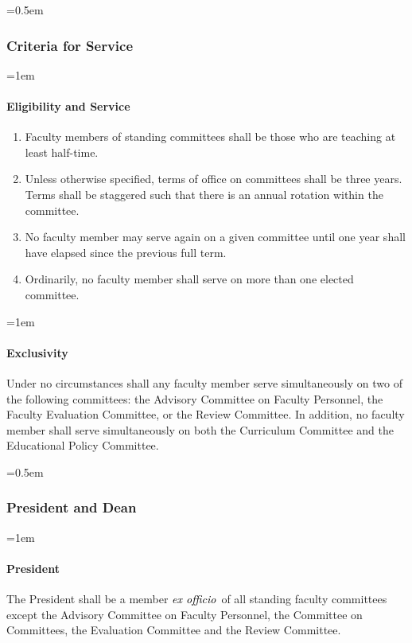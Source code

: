 \documentclass{manual}
\newcommand{\keyword}[1]{\textcolor{black}{#1}}
\newcommand{\exoff}{\keyword{\textit{ex officio}}~}
\let\oldsubsubsection\subsubsection
\renewcommand\subsubsection{\leftskip=0.5em\oldsubsubsection}
\let\oldparagraph\paragraph
\renewcommand\paragraph{\leftskip=1em\oldparagraph}
\newcommand{\itemLevelA}{\alph*.}
\newcommand{\itemRefA}{\alph*}
\begin{document}
\subsubsection{Criteria for Service}
\paragraph{Eligibility and Service}

\begin{enumerate}[label=\itemLevelA,ref=\itemRefA]
\item Faculty members of standing committees shall be those who are teaching at least half-time.

\item Unless otherwise specified, terms of office on committees shall be three years. Terms shall be staggered such that there is an annual rotation within the committee.

\item No faculty member may serve again on a given committee until one year shall have elapsed since the previous full term.

\item Ordinarily, no faculty member shall serve on more than one elected committee.
\end{enumerate}

\paragraph{Exclusivity}
Under no circumstances shall any faculty member serve simultaneously on two of the following committees: the Advisory Committee on Faculty Personnel, the Faculty Evaluation Committee, or the Review Committee. In addition, no faculty member shall serve simultaneously on both the Curriculum Committee and the Educational Policy Committee.

\subsubsection{President and Dean}
\paragraph{President}
The President shall be a member \exoff of all standing faculty committees except the Advisory Committee on Faculty Personnel, the Committee on Committees, the Evaluation Committee and the Review Committee.
\end{document}
